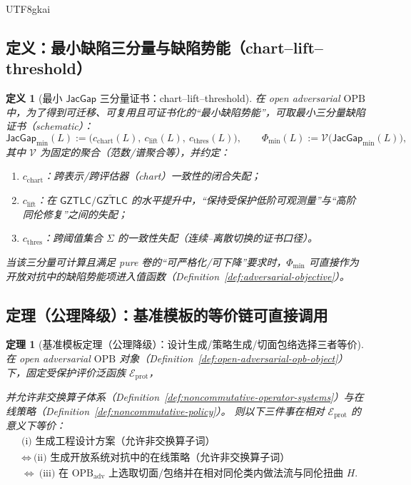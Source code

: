 \documentclass[12pt]{article}
\newtheorem{definition}{定义}[section]
\newtheorem{theorem}{定理}[section]
\newcommand{\GZTLC}{\ensuremath{\mathsf{GZTLC}}}
\newcommand{\JacGap}{\ensuremath{\mathsf{JacGap}}}
\newcommand{\OPB}{\ensuremath{\mathrm{OPB}}}
\begin{document}
\begin{CJK*}{UTF8}{gkai}
\subsection{定义：最小缺陷三分量与缺陷势能（chart--lift--threshold）}

\begin{definition}[最小 \JacGap{} 三分量证书：chart--lift--threshold]
\label{def:opb-jacgap-minimal}
在 open adversarial \OPB{} 中，为了得到可迁移、可复用且可证书化的“最小缺陷势能”，可取最小三分量缺陷证书（schematic）：
\[
\JacGap_{\min}(L)
:=
\bigl(
  c_{\mathrm{chart}}(L),\ c_{\mathrm{lift}}(L),\ c_{\mathrm{thres}}(L)
\bigr),
\qquad
\Phi_{\min}(L):=\mathcal{V}\bigl(\JacGap_{\min}(L)\bigr),
\]
其中 $\mathcal{V}$ 为固定的聚合（范数/谱聚合等），并约定：
\begin{enumerate}
  \item $c_{\mathrm{chart}}$：跨表示/跨评估器（chart）一致性的闭合失配；
  \item $c_{\mathrm{lift}}$：在 $\GZTLC/\widetilde{\GZTLC}$ 的水平提升中，“保持受保护低阶可观测量”与“高阶同伦修复”之间的失配；
  \item $c_{\mathrm{thres}}$：跨阈值集合 $\Sigma$ 的一致性失配（连续–离散切换的证书口径）。
\end{enumerate}
当该三分量可计算且满足 pure 卷的“可严格化/可下降”要求时，$\Phi_{\min}$ 可直接作为开放对抗中的缺陷势能项进入值函数（Definition~\ref{def:adversarial-objective}）。
\end{definition}

\subsection{定理（公理降级）：基准模板的等价链可直接调用}

\begin{theorem}[基准模板定理（公理降级）：设计生成/策略生成/切面包络选择三者等价]
\label{thm:opb-benchmark-template-equivalence}
在 open adversarial \OPB{} 对象（Definition~\ref{def:open-adversarial-opb-object}）下，固定受保护评价泛函族 $\mathcal{E}_{\mathrm{prot}}$，

并允许非交换算子体系（Definition~\ref{def:noncommutative-operator-systems}）与在线策略（Definition~\ref{def:noncommutative-policy}）。
则以下三件事在相对 $\mathcal{E}_{\mathrm{prot}}$ 的意义下等价：
\[
\begin{aligned}
&\text{(i) 生成工程设计方案（允许非交换算子词）}\\
&\Longleftrightarrow\ \text{(ii) 生成开放系统对抗中的在线策略（允许非交换算子词）}\\
&\Longleftrightarrow\ \text{(iii) 在 }\OPB_{\mathrm{adv}}\text{ 上选取切面/包络并在相对同伦类内做法流与同伦扭曲 }H.
\end{aligned}
\]
\end{theorem}


\end{CJK*}
\end{document}
